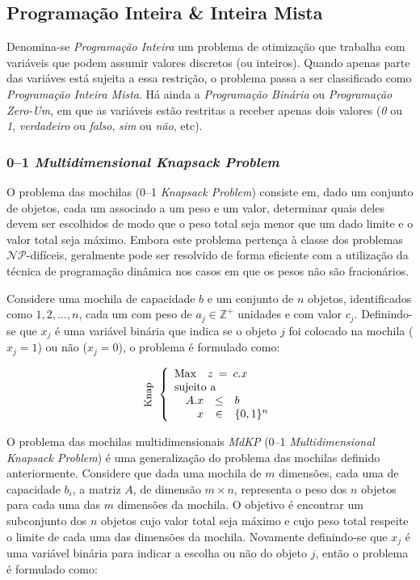 \documentclass[a4paper,10pt]{article}
\newcommand{\fw}[1]{\emph{#1}}
\begin{document}
\subsection{Programação Inteira \& Inteira Mista}
\label{ssec:pi}
Denomina-se \fw{Programação Inteira} um problema de otimização que trabalha com
variáveis que podem assumir valores discretos (ou inteiros). Quando apenas parte
das variáves está sujeita a essa restrição, o problema passa a ser classificado
como \fw{Programação Inteira Mista}. Há ainda a \fw{Programação Binária} ou
\fw{Programação Zero-Um}, em que as variáveis estão restritas a receber apenas
dois valores (\fw{0} ou \fw{1}, \fw{verdadeiro} ou \fw{falso}, \fw{sim} ou
\fw{não}, etc).

\subsubsection{0--1 \fw{Multidimensional Knapsack Problem}}
\label{sssec:mdkp}
O problema das mochilas (0--1 \fw{Knapsack Problem}) consiste em, dado
um conjunto de objetos, cada um associado a um peso e um valor,
determinar quais deles devem ser escolhidos de modo que o peso total
seja menor que um dado limite e o valor total seja máximo. Embora este
problema pertença à classe dos problemas $\mathcal{NP}$-difíceis,
geralmente pode ser resolvido de forma eficiente com a utilização da
técnica de programação dinâmica nos casos em que os pesos não são
fracionários.

Considere uma mochila de capacidade $b$ e um conjunto de $n$ objetos,
identificados como $1,2,\dots,n$, cada um com peso de $a_j \in
\mathbb{Z}^+$ unidades e com valor $c_j$. Definindo-se que $x_j$ é uma
variável binária que indica se o objeto $j$ foi colocado na mochila
($x_j=1$) ou não ($x_j=0$), o problema é formulado como:

$$
 \rotatebox[origin=c]{90}{\small Knap} \,  \, \left\{
  \begin{array}{rrcl}
   \multicolumn{4}{l}{\mbox{Max} \quad z \> = \> c.x}    \\
   \multicolumn{4}{l}{\mbox{sujeito a}}                 \\
   & A.x & \leq & b            \\
   &   x & \in  & \{0,1\}^{n}  \\
  \end{array}
  \right.
$$

O problema das mochilas multidimensionais \fw{MdKP} (0--1
\fw{Multidimensional Knapsack Problem}) é uma generalização do
problema das mochilas definido anteriormente. Considere que dada uma
mochila de $m$ dimensões, cada uma de capacidade $b_i$, a matriz $A$,
de dimensão $m \times n$, representa o peso dos $n$ objetos para cada
uma das $m$ dimensões da mochila. O objetivo é encontrar um
subconjunto dos $n$ objetos cujo valor total seja máximo e cujo peso
total respeite o limite de cada uma das dimensões da mochila.
Novamente definindo-se que $x_j$ é uma variável binária para indicar a
escolha ou não do objeto $j$, então o problema é formulado como:
\end{document}

